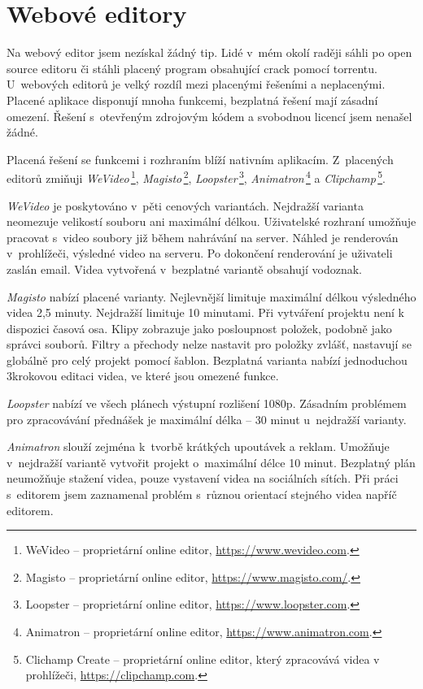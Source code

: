 \section{Webové editory}
Na webový editor jsem nezískal žádný tip. Lidé v~mém okolí raději sáhli po open source editoru či stáhli placený program obsahující crack pomocí torrentu. U~webových editorů je velký rozdíl mezi placenými řešeními a neplacenými. Placené aplikace disponují mnoha funkcemi, bezplatná řešení mají zásadní omezení. Řešení s~otevřeným zdrojovým kódem a svobodnou licencí jsem nenašel žádné.

Placená řešení se funkcemi i rozhraním blíží nativním aplikacím. Z~placených editorů zmiňuji \textit{WeVideo}\,\footnote{WeVideo -- proprietární online editor, \url{https://www.wevideo.com}.}, \textit{Magisto}\,\footnote{Magisto -- proprietární online editor, \url{https://www.magisto.com/}.}, \textit{Loopster}\,\footnote{Loopster -- proprietární online editor, \url{https://www.loopster.com}.}, \textit{Animatron}\,\footnote{Animatron -- proprietární online editor, \url{https://www.animatron.com}.} a \textit{Clipchamp}\,\footnote{Clichamp Create -- proprietární online editor, který zpracovává videa v prohlížeči, \url{https://clipchamp.com}.}.

\textit{WeVideo} je poskytováno v~pěti cenových variantách. Nejdražší varianta neomezuje velikostí souboru ani maximální délkou. Uživatelské rozhraní umožňuje pracovat s~video soubory již během nahrávání na server. Náhled je renderován v~prohlížeči, výsledné video na serveru. Po dokončení renderování je uživateli zaslán email. Videa vytvořená v~bezplatné variantě obsahují vodoznak.

\textit{Magisto} nabízí placené varianty. Nejlevnější limituje maximální délkou výsledného videa 2,5 minuty. Nejdražší limituje 10 minutami. Při vytváření projektu není k dispozici časová osa. Klipy zobrazuje jako posloupnost položek, podobně jako správci souborů. Filtry a přechody nelze nastavit pro položky zvlášť, nastavují se globálně pro celý projekt pomocí šablon. Bezplatná varianta nabízí jednoduchou 3krokovou editaci videa, ve které jsou omezené funkce.

\textit{Loopster} nabízí ve všech plánech výstupní rozlišení 1080p. Zásadním problémem pro zpracovávání přednášek je maximální délka -- 30 minut u~nejdražší varianty.

\textit{Animatron} slouží zejména k~tvorbě krátkých upoutávek a reklam. Umožňuje v~nejdražší variantě vytvořit projekt o~maximální délce 10 minut. Bezplatný plán neumožňuje stažení videa, pouze vystavení videa na sociálních sítích. Při práci s~editorem jsem zaznamenal problém s~různou orientací stejného videa napříč editorem.

